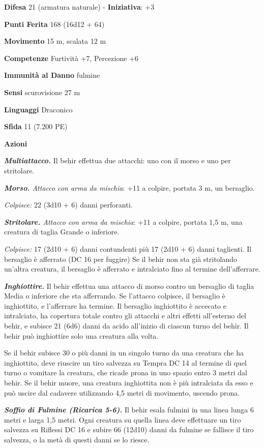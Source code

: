 \begin{multicols}{2}
\textbf{Difesa} 21 (armatura naturale) - \textbf{Iniziativa}: +3

\textbf{Punti Ferita} 168 (16d12 + 64)

\textbf{Movimento} 15 m, scalata 12 m

\textbf{Competenze} Furtività +7, Percezione +6

\textbf{Immunità al Danno} fulmine

\textbf{Sensi} scurovisione 27 m

\textbf{Linguaggi} Draconico

\textbf{Sfida} 11 (7.200 PE)

\textbf{Azioni}

\emph{\textbf{Multiattacco.}} Il behir effettua due attacchi: uno con il
morso e uno per stritolare.

\emph{\textbf{Morso.} Attacco con arma da mischia}: +11 a colpire,
portata 3 m, un bersaglio.

\emph{Colpisce:} 22 (3d10 + 6) danni perforanti.

\emph{\textbf{Stritolare.} Attacco con arma da mischia}: +11 a colpire,
portata 1,5 m, una creatura di taglia Grande o inferiore.

\emph{Colpisce:} 17 (2d10 + 6) danni contundenti più 17 (2d10 + 6) danni
taglienti. Il bersaglio è afferrato (DC 16 per fuggire) Se il behir non
sta già stritolando un'altra creatura, il bersaglio è afferrato e
intralciato fino al termine dell'afferrare.

\emph{\textbf{Inghiottire.}} Il behir effettua una attacco di morso
contro un bersaglio di taglia Media o inferiore che sta afferrando. Se
l'attacco colpisce, il bersaglio è inghiottito, e l'afferrare ha
termine. Il bersaglio inghiottito è accecato e intralciato, ha copertura
totale contro gli attacchi e altri effetti all'esterno del behir, e
subisce 21 (6d6) danni da acido all'inizio di ciascun turno del behir.
Il behir può inghiottire solo una creatura alla volta.

Se il behir subisce 30 o più danni in un singolo turno da una creatura
che ha inghiottito, deve riuscire un tiro salvezza su Tempra DC 14
al termine di quel turno o vomitare la creatura, che ricade prona in uno
spazio entro 3 metri dal behir. Se il behir muore, una creatura
inghiottita non è più intralciata da esso e può uscire dal cadavere
utilizzando 4,5 metri di movimento, uscendo prona.

\emph{\textbf{Soffio di Fulmine (Ricarica 5-6).}} Il behir esala fulmini
in una linea lunga 6 metri e larga 1,5 metri. Ogni creatura su quella
linea deve effettuare un tiro salvezza su Riflessi DC 16 e subire 66
(12d10) danni da fulmine se fallisce il tiro salvezza, o la metà di
questi danni se lo riesce.


\end{multicols}

